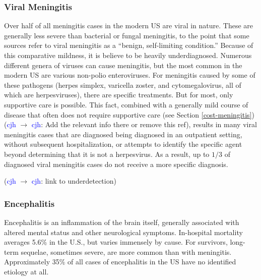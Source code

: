 \documentclass[12pt]{article}
\newcommand{\cjh}{\textcolor{blue}{cjh}}
\newcommand{\msg}[3]{(#1 $\rightarrow$ #2: #3)}
\newcommand{\mcc}[1]{\msg\cjh\cjh{#1}}
\begin{document}
        \subsubsection{Viral Meningitis}
            \label{viral-meningitis}
            Over half of all meningitis cases in the modern US are viral in nature. These are generally less severe than bacterial or fungal meningitis, to the point that some sources refer to viral meningitis as a ``benign, self-limiting condition.''\cite{asdf} Because of this comparative mildness, it is believe to be heavily underdiagnosed. Numerous different genera of viruses can cause meningitis, but the most common in the modern US are various non-polio enteroviruses. For meningitis caused by some of these pathogens (herpes simplex, varicella zoster, and cytomegalovirus, all of which are herpesviruses), there are specific treatments. But for most, only supportive care is possible. This fact, combined with a generally mild course of disease that often does not require supportive care (see Section \ref{cost-meningitis})\mcc{Add the relevant info there or remove this ref}, results in many viral meningitis cases that are diagnosed being diagnosed in an outpatient setting, without subsequent hospitalization, or attempts to identify the specific agent beyond determining that it is not a herpesvirus. As a result, up to $1/3$ of diagnosed viral meningitis cases do not receive a more specific diagnosis.

            \mcc{link to underdetection}

        \subsubsection{Encephalitis}
            \label{encephalitis}

            Encephalitis is an inflammation of the brain itself, generally associated with altered mental status and other neurological symptoms. In-hospital mortality averages 5.6\% in the U.S., but varies immensely by cause. For survivors, long-term sequelae, sometimes severe, are more common than with meningitis. Approximately 35\% of all cases of encephalitis in the US have no identified etiology at all\cite{george2014encephalitis}.
            
\end{document}
